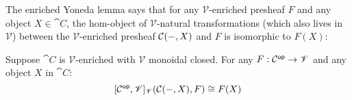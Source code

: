 The enriched Yoneda lemma says that for any $\mathscr{V}$-enriched presheaf $F$ and any object $X \in
\cat{C}$, the hom-object of $\mathscr{V}$-natural transformations (which also lives in $\mathscr{V}$) between
the $\mathscr{V}$-enriched presheaf ${\mathcal{C}}(-,X)$ and $F$ is isomorphic to $F(X)$:

\begin{lemma}
Suppose $\cat{C}$ is $\mathscr{V}$-enriched with $\mathscr{V}$ monoidal closed. For any $F: \mathcal{C}^{\mathsf{op}} \to
\mathscr{V}$ and any object $X$ in $\cat{C}$:
\[{[\mathcal{C}^{\mathsf{op}},\mathscr{V}]_{\mathscr{V}}}({\mathcal{C}}(-,X),F) \cong F(X)\]
\end{lemma}
